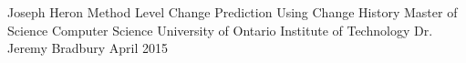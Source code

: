 

\usepackage{tabularx}
\usepackage{hyperref}
\usepackage{url}

\hypersetup{
    colorlinks,
    citecolor=black,
    filecolor=black,
    linkcolor=black,
    urlcolor=black
}



\thesisTitle
  {Joseph Heron}
  {Method Level Change Prediction Using Change History}
  {Master of Science}
  {Computer Science}
  {University of Ontario Institute of Technology}
  {Dr. Jeremy Bradbury}
  {April}
  {2015}




\singlespacing
\tableofcontents
\listoffigures
\listoftables
\lstlistoflistings
\printglossary[style=list]
\clearpage
\doublespacing













